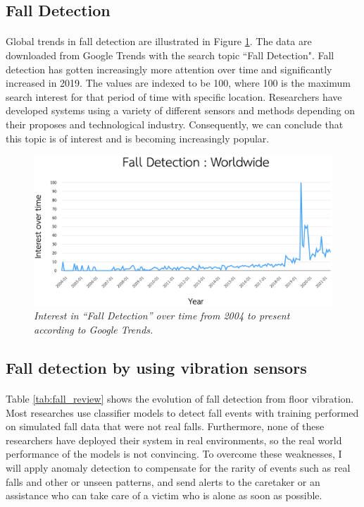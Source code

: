 \subsection{Fall Detection}
\paragraph{}
Global trends in fall detection are illustrated in Figure \ref{fig:fall_trend}. The data are downloaded from Google Trends with the search topic ``Fall Detection". Fall detection has gotten increasingly more attention over time and significantly increased in 2019. The values are indexed to be 100, where 100 is the maximum search interest for that period of time with specific location. Researchers have developed systems using a variety of different sensors and methods depending on their proposes and technological industry. Consequently, we can conclude that this topic is of interest and is becoming increasingly popular.


\begin{figure}[H]
  \centering
  \caption[Interest in “Fall Detection” over time from 2004 to present according to Google Trends.]{\emph{Interest in “Fall Detection” over time from 2004 to present according to Google Trends.}}\label{fig:fall_trend}
  \includegraphics[width=\textwidth]{figures/fall_trend.png}  
\end{figure}

\subsection{Fall detection by using vibration sensors}
\paragraph{}
Table \ref{tab:fall_review} shows the evolution of fall detection from floor vibration. Most researches use classifier models to detect fall events with training performed on simulated fall data that were not real falls. Furthermore, none of these researchers have deployed their system in real environments, so the real world performance of the models is not convincing. To overcome these weaknesses, I will apply anomaly detection to compensate for the rarity of events such as real falls and other or unseen patterns, and send alerts to the caretaker or an assistance who can take care of a victim who is alone as soon as possible.


